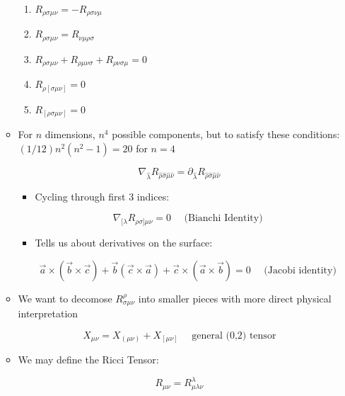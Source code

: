 \begin{itemize}
\begin{itemize}
\begin{enumerate}
          \item $R_{\rho\sigma\mu\nu}=-R_{\rho\sigma\nu\mu}$

          \item $R_{\rho\sigma\mu\nu}=R_{\nu\mu\rho\sigma}$

          \item $R_{\rho\sigma\mu\nu}+R_{\rho\mu\nu\sigma}+R_{\rho\nu\sigma\mu}=0$

          \item $R_{\rho[\sigma\mu\nu]}=0$

          \item $R_{[\rho\sigma\mu\nu]}=0$

        \end{enumerate}

      \item For $n$ dimensions, $n^4$ possible components, but to satisfy these conditions: $(1/12)n^2(n^2-1)=20$ for $n=4$

        $$\nabla_{\hat{\lambda}}R_{\hat{\rho}\hat{\sigma}\hat{\mu}\hat{\nu}}=\partial_{\hat{\lambda}}R_{\hat{\rho}\hat{\sigma}\hat{\mu}\hat{\nu}}$$

        \begin{itemize}

          \item Cycling through first 3 indices:

            $$\nabla_{[\lambda}R_{\rho\sigma]\mu\nu}=0\quad\text{ (Bianchi Identity)}$$

          \item Tells us about derivatives on the surface:

            $$\vec{a}\times(\vec{b}\times\vec{c})+\vec{b}(\vec{c}\times\vec{a})+\vec{c}\times(\vec{a}\times\vec{b})=0\quad\text{ (Jacobi identity)}$$

        \end{itemize}

      \item We want to decomose $R^{\rho}_{\sigma\mu\nu}$ into smaller pieces with more direct physical interpretation

        $$X_{\mu\nu}=X_{(\mu\nu)}+X_{[\mu\nu]}\quad\text{ general (0,2) tensor}$$

      \item We may define the Ricci Tensor:

        $$R_{\mu\nu}=R^{\lambda}_{\mu\lambda\nu}$$

        \begin{itemize}


\end{itemize}
\end{itemize}
\end{itemize}
